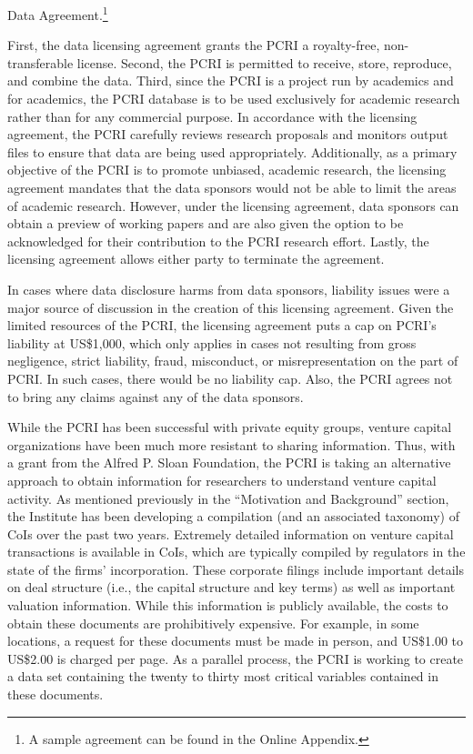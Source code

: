 Data Agreement.\footnote{A sample agreement can be found in the Online Appendix.}

First, the data licensing agreement grants the PCRI a royalty-free, non-transferable license. Second, the PCRI is permitted to receive, store, reproduce, and combine the data. Third, since the PCRI is a project run by academics and for academics, the PCRI database is to be used exclusively for academic research rather than for any commercial purpose. In accordance with the licensing agreement, the PCRI carefully reviews research proposals and monitors output files to ensure that data are being used appropriately. Additionally, as a primary objective of the PCRI is to promote unbiased, academic research, the licensing agreement mandates that the data sponsors would not be able to limit the areas of academic research. However, under the licensing agreement, data sponsors can obtain a preview of working papers and are also given the option to be acknowledged for their contribution to the PCRI research effort. Lastly, the licensing agreement allows either party to terminate the agreement.

In cases where data disclosure harms from data sponsors, liability issues were a major source of discussion in the creation of this licensing agreement. Given the limited resources of the PCRI, the licensing agreement puts a cap on PCRI's liability at US\$1,000, which only applies in cases not resulting from gross negligence, strict liability, fraud, misconduct, or misrepresentation on the part of PCRI. In such cases, there would be no liability cap. Also, the PCRI agrees not to bring any claims against any of the data sponsors.

While the PCRI has been successful with private equity groups, venture capital organizations have been much more resistant to sharing information. Thus, with a grant from the Alfred P. Sloan Foundation, the PCRI is taking an alternative approach to obtain information for researchers to understand venture capital activity. As mentioned previously in the ``Motivation and Background'' section, the Institute has been developing a compilation (and an associated taxonomy) of CoIs over the past two years. Extremely detailed information on venture capital transactions is available in CoIs, which are typically compiled by regulators in the state of the firms' incorporation. These corporate filings include important details on deal structure (i.e., the capital structure and key terms) as well as important valuation information. While this information is publicly available, the costs to obtain these documents are prohibitively expensive. For example, in some locations, a request for these documents must be made in person, and US\$1.00 to US\$2.00 is charged per page. As a parallel process, the PCRI is working to create a data set containing the twenty to thirty most critical variables contained in these documents.

